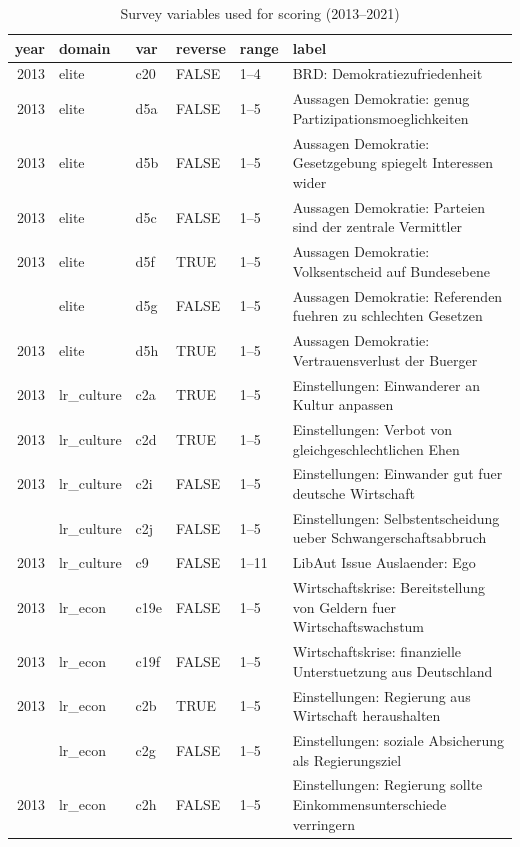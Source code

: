 
\begin{longtable}[t]{rlllll}
\caption{\label{tab:tab:variables}Survey variables used for scoring (2013--2021)}\\
\toprule
year & domain & var & reverse & range & label\\
\midrule
2013 & elite & c20 & FALSE & 1–4 & BRD: Demokratiezufriedenheit\\
2013 & elite & d5a & FALSE & 1–5 & Aussagen Demokratie: genug Partizipationsmoeglichkeiten\\
2013 & elite & d5b & FALSE & 1–5 & Aussagen Demokratie: Gesetzgebung spiegelt Interessen wider\\
2013 & elite & d5c & FALSE & 1–5 & Aussagen Demokratie: Parteien sind der zentrale Vermittler\\
2013 & elite & d5f & TRUE & 1–5 & Aussagen Demokratie: Volksentscheid auf Bundesebene\\
\addlinespace
2013 & elite & d5g & FALSE & 1–5 & Aussagen Demokratie: Referenden fuehren zu schlechten Gesetzen\\
2013 & elite & d5h & TRUE & 1–5 & Aussagen Demokratie: Vertrauensverlust der Buerger\\
2013 & lr\_culture & c2a & TRUE & 1–5 & Einstellungen: Einwanderer an Kultur anpassen\\
2013 & lr\_culture & c2d & TRUE & 1–5 & Einstellungen: Verbot von gleichgeschlechtlichen Ehen\\
2013 & lr\_culture & c2i & FALSE & 1–5 & Einstellungen: Einwander gut fuer deutsche Wirtschaft\\
\addlinespace
2013 & lr\_culture & c2j & FALSE & 1–5 & Einstellungen: Selbstentscheidung ueber Schwangerschaftsabbruch\\
2013 & lr\_culture & c9 & FALSE & 1–11 & LibAut Issue Auslaender: Ego\\
2013 & lr\_econ & c19e & FALSE & 1–5 & Wirtschaftskrise: Bereitstellung von Geldern fuer Wirtschaftswachstum\\
2013 & lr\_econ & c19f & FALSE & 1–5 & Wirtschaftskrise: finanzielle Unterstuetzung aus Deutschland\\
2013 & lr\_econ & c2b & TRUE & 1–5 & Einstellungen: Regierung aus Wirtschaft heraushalten\\
\addlinespace
2013 & lr\_econ & c2g & FALSE & 1–5 & Einstellungen: soziale Absicherung als Regierungsziel\\
2013 & lr\_econ & c2h & FALSE & 1–5 & Einstellungen: Regierung sollte Einkommensunterschiede verringern\\

\end{longtable}
